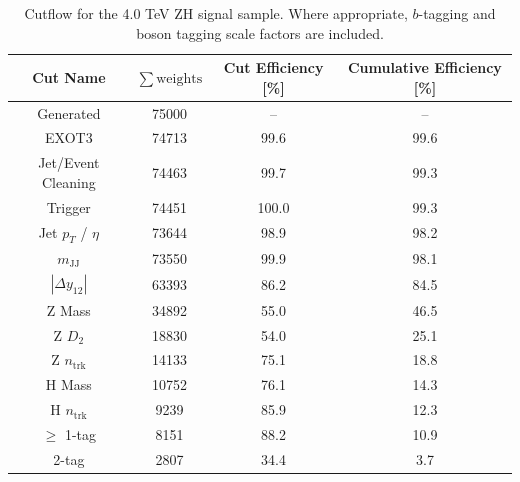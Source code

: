 \begin{table}[htbp!]
    \normalsize
    \centering
    \begin{tabular}{c||ccc}
        Cut Name & $\sum{\mathrm{weights}}$ & Cut Efficiency [\%] & Cumulative Efficiency [\%] \\ \hline
        Generated & 75000 & -- & --\\ \hline
        EXOT3 & 74713 & 99.6 & 99.6\\ \hline
        Jet/Event Cleaning & 74463 & 99.7 & 99.3\\ \hline
        Trigger & 74451 & 100.0 & 99.3\\ \hline
        Jet $p_{T}$ / $\eta$ & 73644 & 98.9 & 98.2\\ \hline
        $m_{\mathrm{JJ}}$ & 73550 & 99.9 & 98.1\\ \hline
        $|\Delta y_{12}|$ & 63393 & 86.2 & 84.5\\ \hline
        Z Mass & 34892 & 55.0 & 46.5\\ \hline
        Z $D_{2}$ & 18830 & 54.0 & 25.1\\ \hline
        Z $n_{\mathrm{trk}}$ & 14133 & 75.1 & 18.8\\ \hline
        H Mass & 10752 & 76.1 & 14.3\\ \hline
        H $n_{\mathrm{trk}}$ & 9239 & 85.9 & 12.3\\ \hline
        $\geq$ 1-tag & 8151 & 88.2 & 10.9\\ \hline
        2-tag & 2807 & 34.4 & 3.7\\ \hline
    \end{tabular}
    \caption{Cutflow for the 4.0 TeV ZH signal sample.  Where appropriate, $b$-tagging and boson tagging scale factors are included. }
    \label{tab:zh_4TeV_cutflow}
\end{table}

